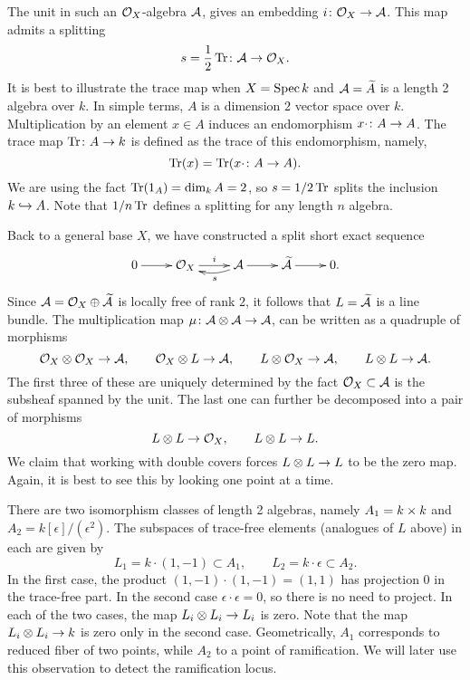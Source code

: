 The unit in such an $\mathcal{O}_X$-algebra $\mathcal{A}$, gives an embedding $i \cn \Oc_X \rarr \Ac$. This map admits a splitting
\[
s = \frac{1}{2} \Tr \cn \Ac \rarr \Oc_X.
\]
It is best to illustrate the trace map when $X = \operatorname{Spec} k$ and $\mathcal{A} = \widetilde{A}$ is a length 2 algebra over $k$. In simple terms, $A$ is a dimension $2$ vector space over $k$. Multiplication by an element $x \in A$ induces an endomorphism $x \cdot \cn A \rarr A$. The trace map $\Tr \cn A \rarr k$ is defined as the trace of this endomorphism, namely,
\[
\Tr(x) = \Tr( x \cdot \cn A \rarr A ).
\]
We are using the fact $\operatorname{Tr}(1_A) = \dim_k A = 2$, so $s = 1/2 \operatorname{Tr}$ splits the inclusion $k \hookrightarrow A$. Note that $1/n \operatorname{Tr}$ defines a splitting for any length $n$ algebra.

Back to a general base $X$, we have constructed a split short exact sequence
\[\xymatrix{
  0 \ar[r] &
  \Oc_X \ar[r]^-{i} &
  \Ac \ar@/^/[l]^-{s} \ar[r] &
  \wtilde{\Ac} \ar[r] &
  0.
}\]
Since $\mathcal{A} = \mathcal{O}_X \oplus \widetilde{\mathcal{A}}$ is locally free of rank $2$, it follows that $L = \widetilde{\mathcal{A}}$ is a line bundle. The multiplication map $\mu \cn \Ac \otimes \Ac \rarr \Ac$, can be written as a quadruple of morphisms
\[
\Oc_X \otimes \Oc_X \rarr \Ac, \qquad
\Oc_X \otimes L \rarr \Ac, \qquad
L \otimes \Oc_X \rarr \Ac, \qquad
L \otimes L \rarr \Ac.
\]
The first three of these are uniquely determined by the fact $\mathcal{O}_X \subset \mathcal{A}$ is the subsheaf spanned by the unit. The last one can further be decomposed into a pair of morphisms
\[
L \otimes L \rarr \Oc_X, \qquad
L \otimes L \rarr L.
\]
We claim that working with double covers forces $L \otimes L \rarr L$ to be the zero map. Again, it is best to see this by looking one point at a time.

There are two isomorphism classes of length 2 algebras, namely $A_1 = k \times k$ and $A_2 = k[\epsilon]/(\epsilon^2)$. The subspaces of trace-free elements (analogues of $L$ above) in each are given by
\[
L_1 = k \cdot (1,-1) \subset A_1, \qquad
L_2 = k \cdot \epsilon \subset A_2.
\]
In the first case, the product $(1,-1) \cdot (1,-1) = (1,1)$ has projection $0$ in the trace-free part. In the second case $\epsilon \cdot \epsilon = 0$, so there is no need to project. In each of the two cases, the map $L_i \otimes L_i \rarr L_i$ is zero. Note that the map $L_i \otimes L_i \rarr k$ is zero only in the second case. Geometrically, $A_1$ corresponds to reduced fiber of two points, while $A_2$ to a point of ramification. We will later use this observation to detect the ramification locus.

